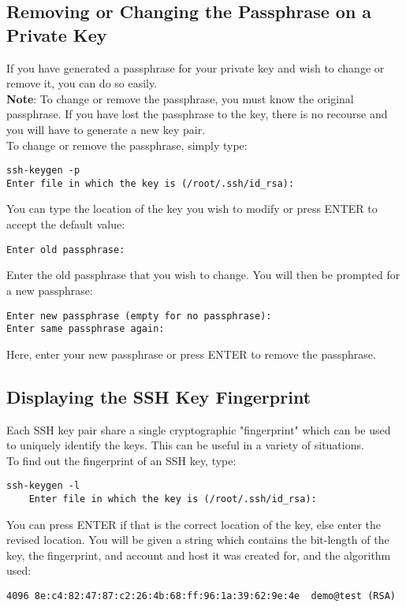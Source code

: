 \documentclass[12pt]{report}
\begin{document}
\subsection{Removing or Changing the Passphrase on a Private Key}
If you have generated a passphrase for your private key and wish to change or remove it, you can do so easily.
\\\textbf{Note}: To change or remove the passphrase, you must know the original passphrase. If you have lost the passphrase to the key, there is no recourse and you will have to generate a new key pair.\\
To change or remove the passphrase, simply type:
\begin{lstlisting}    
ssh-keygen -p
Enter file in which the key is (/root/.ssh/id_rsa):
\end{lstlisting}    
You can type the location of the key you wish to modify or press ENTER to accept the default value:
\begin{lstlisting}    
Enter old passphrase:
\end{lstlisting}    
Enter the old passphrase that you wish to change. You will then be prompted for a new passphrase:
\begin{lstlisting}    
Enter new passphrase (empty for no passphrase): 
Enter same passphrase again:
\end{lstlisting}    
Here, enter your new passphrase or press ENTER to remove the passphrase.

\subsection{Displaying the SSH Key Fingerprint}
Each SSH key pair share a single cryptographic "fingerprint" which can be used to uniquely identify the keys. This can be useful in a variety of situations.
\\To find out the fingerprint of an SSH key, type:
\begin{lstlisting} 
ssh-keygen -l
    Enter file in which the key is (/root/.ssh/id_rsa):
\end{lstlisting} 
You can press ENTER if that is the correct location of the key, else enter the revised location. You will be given a string which contains the bit-length of the key, the fingerprint, and account and host it was created for, and the algorithm used:
\begin{lstlisting} 
4096 8e:c4:82:47:87:c2:26:4b:68:ff:96:1a:39:62:9e:4e  demo@test (RSA)
\end{lstlisting} 
\end{document}
